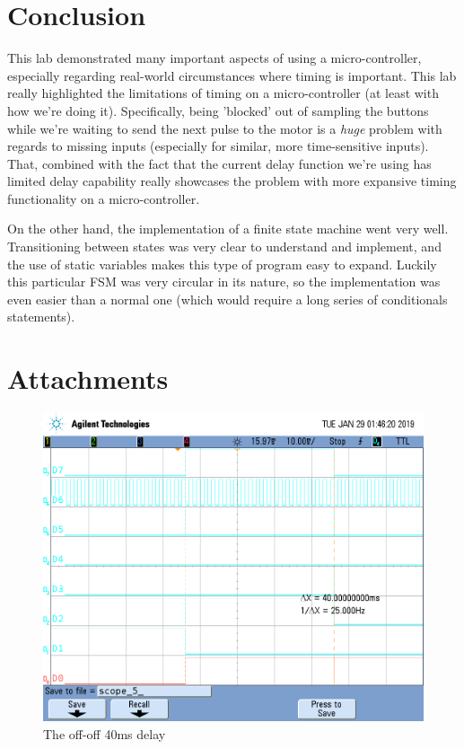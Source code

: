 \documentclass[a4paper, 12pt]{article}
\begin{document}
\section{Conclusion}
This lab demonstrated many important aspects of using a micro-controller, especially regarding real-world circumstances where timing is important. This lab really highlighted the limitations of timing on a micro-controller (at least with how we're doing it). Specifically, being 'blocked' out of sampling the buttons while we're waiting to send the next pulse to the motor is a \textit{huge} problem with regards to missing inputs (especially for similar, more time-sensitive inputs). That, combined with the fact that the current delay function we're using has limited delay capability really showcases the problem with more expansive timing functionality on a micro-controller.

On the other hand, the implementation of a finite state machine went very well. Transitioning between states was very clear to understand and implement, and the use of static variables makes this type of program easy to expand. Luckily this particular FSM was very circular in its nature, so the implementation was even easier than a normal one (which would require a long series of conditionals statements).

\newpage
\section{Attachments}
\begin{figure}[htb]
\centering
\includegraphics[width=.8\textwidth]{0-0.png}
\caption{The off-off 40ms delay}
\end{figure}
\end{document}

